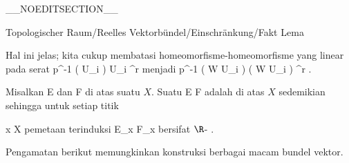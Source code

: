 __NOEDITSECTION__

{Topologischer Raum/Reelles Vektorbündel/Einschränkung/Fakt}
{Lema}
{}
{

\faktzusatz {}
\faktzusatz {}

}
{

Hal ini jelas; kita cukup membatasi homeomorfisme-homeomorfisme yang linear pada serat
 {p^{-1} \left(  U_i  \right) } { U_i \times \R^r
} {}
menjadi
 {p^{-1} \left(  W \cap U_i  \right) } { \left(  W \cap U_i  \right)  \times \R^r
} {}
.

}

{}
{

Misalkan
\mathkor {} {E} {dan} {F} {}
di atas suatu
$X$. Suatu
\maabb {\varphi} { E } { F
} {}
adalah
di atas $X$ sedemikian sehingga untuk setiap titik

\mavergleichskette
{\vergleichskette
{ x
}
{ \in }{ X
}
{  }{
}
{    }{
}
{   }{
}
}
{}{}{}
pemetaan terinduksi
 { E_x} {F_x
} {}
bersifat
$\R$-
.

}

Pengamatan berikut memungkinkan konstruksi berbagai macam bundel vektor.

